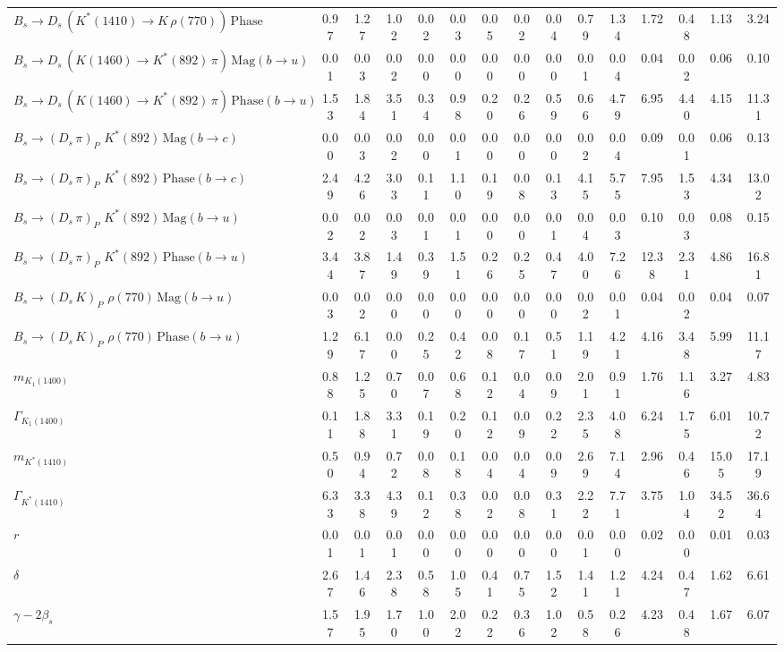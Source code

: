 \begin{tabular}{l  c  c  c  c  c  c  c  c  c  c  c  c  c  | c }
$B_s \to D_s \, ( K^{*}(1410) \to K \, \rho(770) ) \, \text{Phase}$ & 0.97 & 1.27 & 1.02 & 0.02 & 0.03 & 0.05 & 0.02 & 0.04 & 0.79 & 1.34 & 1.72 & 0.48 & 1.13 & 3.24 \\ 
$B_s \to D_s \, ( K(1460) \to K^{*}(892) \, \pi ) \, \text{Mag} (b \to u)$ & 0.01 & 0.03 & 0.02 & 0.00 & 0.00 & 0.00 & 0.00 & 0.00 & 0.01 & 0.04 & 0.04 & 0.02 & 0.06 & 0.10 \\ 
$B_s \to D_s \, ( K(1460) \to K^{*}(892) \, \pi ) \, \text{Phase} (b \to u)$ & 1.53 & 1.84 & 3.51 & 0.34 & 0.98 & 0.20 & 0.26 & 0.59 & 0.66 & 4.79 & 6.95 & 4.40 & 4.15 & 11.31 \\ 
$B_s \to ( D_s \, \pi)_{P} \, \, K^{*}(892) \, \text{Mag} (b \to c)$ & 0.00 & 0.03 & 0.02 & 0.00 & 0.01 & 0.00 & 0.00 & 0.00 & 0.02 & 0.04 & 0.09 & 0.01 & 0.06 & 0.13 \\ 
$B_s \to ( D_s \, \pi)_{P} \, \, K^{*}(892) \, \text{Phase} (b \to c)$ & 2.49 & 4.26 & 3.03 & 0.11 & 1.10 & 0.19 & 0.08 & 0.13 & 4.15 & 5.75 & 7.95 & 1.53 & 4.34 & 13.02 \\ 
$B_s \to ( D_s \, \pi)_{P} \, \, K^{*}(892) \, \text{Mag} (b \to u)$ & 0.02 & 0.02 & 0.03 & 0.01 & 0.01 & 0.00 & 0.00 & 0.01 & 0.04 & 0.03 & 0.10 & 0.03 & 0.08 & 0.15 \\ 
$B_s \to ( D_s \, \pi)_{P} \, \, K^{*}(892) \, \text{Phase} (b \to u)$ & 3.44 & 3.87 & 1.49 & 0.39 & 1.51 & 0.26 & 0.25 & 0.47 & 4.00 & 7.26 & 12.38 & 2.31 & 4.86 & 16.81 \\ 
$B_s \to ( D_s \, K)_{P} \, \, \rho(770) \, \text{Mag} (b \to u)$ & 0.03 & 0.02 & 0.00 & 0.00 & 0.00 & 0.00 & 0.00 & 0.00 & 0.02 & 0.01 & 0.04 & 0.02 & 0.04 & 0.07 \\ 
$B_s \to ( D_s \, K)_{P} \, \, \rho(770) \, \text{Phase} (b \to u)$ & 1.29 & 6.17 & 0.00 & 0.25 & 0.42 & 0.08 & 0.17 & 0.51 & 1.19 & 4.21 & 4.16 & 3.48 & 5.99 & 11.17 \\ 
$m_{K_1(1400)} $ & 0.88 & 1.25 & 0.70 & 0.07 & 0.68 & 0.12 & 0.04 & 0.09 & 2.01 & 0.91 & 1.76 & 1.16 & 3.27 & 4.83 \\ 
$\Gamma_{K_1(1400)}$ & 0.11 & 1.88 & 3.31 & 0.19 & 0.20 & 0.12 & 0.09 & 0.22 & 2.35 & 4.08 & 6.24 & 1.75 & 6.01 & 10.72 \\ 
$m_{K^{*}(1410)}$ & 0.50 & 0.94 & 0.72 & 0.08 & 0.18 & 0.04 & 0.04 & 0.09 & 2.69 & 7.14 & 2.96 & 0.46 & 15.05 & 17.19 \\ 
$\Gamma_{K^{*}(1410)}$ & 6.33 & 3.38 & 4.39 & 0.12 & 0.38 & 0.02 & 0.08 & 0.31 & 2.22 & 7.71 & 3.75 & 1.04 & 34.52 & 36.64 \\ 
$r$ & 0.01 & 0.01 & 0.01 & 0.00 & 0.00 & 0.00 & 0.00 & 0.00 & 0.01 & 0.00 & 0.02 & 0.00 & 0.01 & 0.03 \\ 
$\delta$ & 2.67 & 1.46 & 2.38 & 0.58 & 1.05 & 0.41 & 0.75 & 1.52 & 1.41 & 1.21 & 4.24 & 0.47 & 1.62 & 6.61 \\ 
$\gamma - 2 \beta_{s}$ & 1.57 & 1.95 & 1.70 & 1.00 & 2.02 & 0.22 & 0.36 & 1.02 & 0.58 & 0.26 & 4.23 & 0.48 & 1.67 & 6.07 \\ 
\hline
\hline
\end{tabular}
